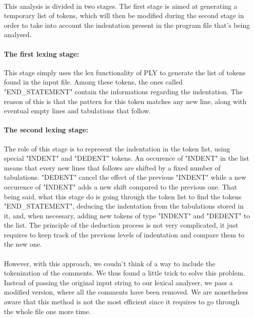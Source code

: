 \documentclass[12pt,a4paper]{article}
\begin{document}
\paragraph{}
This analysis is divided in two stages. The first stage is aimed at generating a temporary list of tokens, which will then be modified during the second stage in order to take into account the indentation present in the program file that's being analysed.

\paragraph{The first lexing stage:}
This stage simply uses the lex functionality of PLY to generate the list of tokens found in the input file. Among these tokens, the ones called "END\_STATEMENT" contain the informations regarding the indentation. The reason of this is that the pattern for this token matches any new line, along with eventual empty lines and tabulations that follow.

\paragraph{The second lexing stage:}
The role of this stage is to represent the indentation in the token list, using special "INDENT" and "DEDENT" tokens. An occurence of "INDENT" in the list means that every new lines that follows are shifted by a fixed number of tabulations. "DEDENT" cancel the effect of the previous "INDENT" while a new occurence of "INDENT" adds a new shift compared to the previous one. That being said, what this stage do is going through the token list to find the tokens "END\_STATEMENT", deducing the indentation from the tabulations stored in it, and, when necessary, adding new tokens of type "INDENT" and "DEDENT" to the list. The principle of the deduction process is not very complicated, it just requires to keep track of the previous levels of indentation and compare them to the new one.

\paragraph{}
However, with this approach, we coudn't think of a way to include the tokenization of the comments. We thus found a little trick to solve this problem. Instead of passing the original input string to our lexical analyser, we pass a modified version, where all the comments have been removed. We are nonetheless aware that this method is not the most efficient since it requires to go through the whole file one more time.
\end{document}
